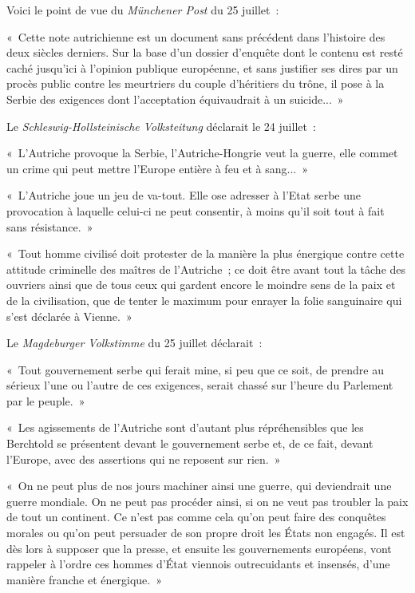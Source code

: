 \documentclass[french,twoside]{book} %
\newenvironment{quoteblock}%
  {\begin{quoting}}
  {\end{quoting}}
\newenvironment{quotebar}{%
    \def\FrameCommand{{\color{rubric!10!}\vrule width 0.5em} \hspace{0.9em}}%
    \def\OuterFrameSep{\itemsep} %
    \MakeFramed {\advance\hsize-\width \FrameRestore}
  }%
  {%
    \endMakeFramed
  }
\renewenvironment{quoteblock}%
  {%
    \savenotes
    \setstretch{0.9}
    \normalfont
    \begin{quotebar}
  }
  {%
    \end{quotebar}
    \spewnotes
  }
\begin{document}
\noindent Voici le point de vue du \emph{Münchener Post} du 25 juillet :\par

\begin{quoteblock}
 \noindent « Cette note autrichienne est un document sans précédent dans l’histoire des deux siècles derniers. Sur la base d’un dossier d’enquête dont le contenu est resté caché jusqu’ici à l’opinion publique européenne, et sans justifier ses dires par un procès public contre les meurtriers du couple d’héritiers du trône, il pose à la Serbie des exigences dont l’acceptation équivaudrait à un suicide... »
\end{quoteblock}

\noindent Le \emph{Schleswig-Hollsteinische Volksteitung} déclarait le 24 juillet :\par

\begin{quoteblock}
 \noindent « L'Autriche provoque la Serbie, l’Autriche-Hongrie veut la guerre, elle commet un crime qui peut mettre l’Europe entière à feu et à sang... »\par
   « L'Autriche joue un jeu de va-tout. Elle ose adresser à l’Etat serbe une provocation à laquelle celui-ci ne peut consentir, à moins qu’il soit tout à fait sans résistance. »\par
 « Tout homme civilisé doit protester de la manière la plus énergique contre cette attitude criminelle des maîtres de l’Autriche ; ce doit être avant tout la tâche des ouvriers ainsi que de tous ceux qui gardent encore le moindre sens de la paix et de la civilisation, que de tenter le maximum pour enrayer la folie sanguinaire qui s’est déclarée à Vienne. »
\end{quoteblock}

\noindent Le \emph{Magdeburger Volkstimme} du 25 juillet déclarait :\par

\begin{quoteblock}
 \noindent « Tout gouvernement serbe qui ferait mine, si peu que ce soit, de prendre au sérieux l’une ou l’autre de ces exigences, serait chassé sur l’heure du Parlement par le peuple. »\par
 « Les agissements de l’Autriche sont d’autant plus répréhensibles que les Berchtold se présentent devant le gouvernement serbe et, de ce fait, devant l’Europe, avec des assertions qui ne reposent sur rien. »\par
 « On ne peut plus de nos jours machiner ainsi une guerre, qui deviendrait une guerre mondiale. On ne peut pas procéder ainsi, si on ne veut pas troubler la paix de tout un continent. Ce n’est pas comme cela qu’on peut faire des conquêtes morales ou qu’on peut persuader de son propre droit les États non engagés. Il est dès lors à supposer que la presse, et ensuite les gouvernements européens, vont rappeler à l’ordre ces hommes d’État viennois outrecuidants et insensés, d’une manière franche et énergique. »
\end{quoteblock}
\end{document}
